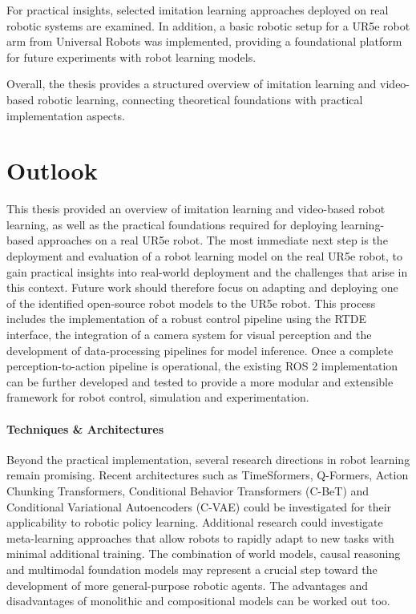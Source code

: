 For practical insights, selected imitation learning approaches deployed on real robotic systems are examined. In addition, a basic robotic setup for a UR5e robot arm from Universal Robots was implemented, providing a foundational platform for future experiments with robot learning models.

Overall, the thesis provides a structured overview of imitation learning and video-based robotic learning, connecting theoretical foundations with practical implementation aspects.




\section{Outlook}

This thesis provided an overview of imitation learning and video-based robot learning, as well as the practical foundations required for deploying learning-based approaches on a real UR5e robot.
The most immediate next step is the deployment and evaluation of a robot learning model on the real UR5e robot, to gain practical insights into real-world deployment and the challenges that arise in this context.
Future work should therefore focus on adapting and deploying one of the identified open-source robot models to the UR5e robot.
This process includes the implementation of a robust control pipeline using the RTDE interface, the integration of a camera system for visual perception and the development of data-processing pipelines for model inference. Once a complete perception-to-action pipeline is operational, the existing ROS 2 implementation can be further developed and tested to provide a more modular and extensible framework for robot control, simulation and experimentation.

\paragraph{Techniques \& Architectures}
Beyond the practical implementation, several research directions in robot learning remain promising. Recent architectures such as TimeSformers, Q-Formers, Action Chunking Transformers, Conditional Behavior Transformers (C-BeT) and Conditional Variational Autoencoders (C-VAE) could be investigated for their applicability to robotic policy learning. 
Additional research could investigate meta-learning approaches that allow robots to rapidly adapt to new tasks with minimal additional training. The combination of world models, causal reasoning and multimodal foundation models may represent a crucial step toward the development of more general-purpose robotic agents. The advantages and disadvantages of monolithic and compositional models can be worked out too.

